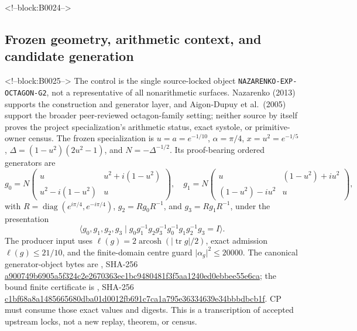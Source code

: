 \documentclass[11pt,a4paper]{article}
\begin{document}
<!--block:B0024-->
\hypertarget{frozen-geometry-arithmetic-context-and-candidate-generation}{%
\subsection{Frozen geometry, arithmetic context, and candidate generation}\label{frozen-geometry-arithmetic-context-and-candidate-generation}}

<!--block:B0025-->
The control is the single source-locked object \texttt{NAZARENKO-EXP-OCTAGON-G2}, not a representative of all nonarithmetic surfaces. Nazarenko (2013)
\citep{P33-S01}
 supports the construction and generator layer, and Aigon-Dupuy et al.~(2005)
\citep{P33-S02}
 support the broader peer-reviewed octagon-family setting; neither source by itself proves the project specialization's arithmetic status, exact systole, or primitive-owner census. The frozen specialization is \(u=a=e^{-1/10}\), \(\alpha=\pi/4\), \(x=u^2=e^{-1/5}\), \(\Delta=(1-u^2)(2u^2-1)\), and \(N=-\Delta^{-1/2}\). Its proof-bearing ordered generators are
\[
 g_0=N\begin{pmatrix}u&u^2+i(1-u^2)\\u^2-i(1-u^2)&u\end{pmatrix},\quad
 g_1=N\begin{pmatrix}u&(1-u^2)+iu^2\\(1-u^2)-iu^2&u\end{pmatrix},
\]
with \(R=\operatorname{diag}(e^{i\pi/4},e^{-i\pi/4})\), \(g_2=Rg_0R^{-1}\), and \(g_3=Rg_1R^{-1}\), under the presentation
\[
 \langle g_0,g_1,g_2,g_3\mid g_0g_1^{-1}g_2g_3^{-1}g_0^{-1}g_1g_2^{-1}g_3=I\rangle .
\]
The producer input uses \(\ell(g)=2\operatorname{arcosh}(|\operatorname{tr}g|/2)\), exact admission \(\ell(g)\leq21/10\), and the finite-domain centre guard \(\lvert\alpha_g\rvert^2\leq20000\). The canonical generator-object bytes are , SHA-256 \url{a900749b6905a5f324c2e2670363ec1bc9480481f3f5aa1240ed0ebbee55e6ca}; the bound finite certificate is , SHA-256 \url{c1bf68a8a1485665680dba01d0012fb691c7ca1a795e36334639e34bbbdbcb1f}. CP must consume those exact values and digests. This is a transcription of accepted upstream locks, not a new replay, theorem, or census.
\end{document}
